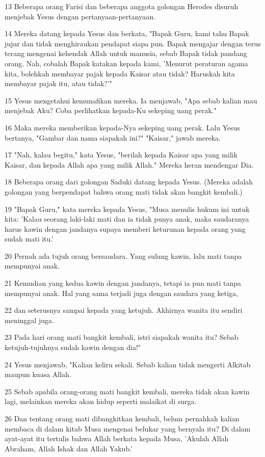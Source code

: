 \par 13 Beberapa orang Farisi dan beberapa anggota golongan Herodes disuruh menjebak Yesus dengan pertanyaan-pertanyaan.
\par 14 Mereka datang kepada Yesus dan berkata, "Bapak Guru, kami tahu Bapak jujur dan tidak menghiraukan pendapat siapa pun. Bapak mengajar dengan terus terang mengenai kehendak Allah untuk manusia, sebab Bapak tidak pandang orang. Nah, cobalah Bapak katakan kepada kami, 'Menurut peraturan agama kita, bolehkah membayar pajak kepada Kaisar atau tidak? Haruskah kita membayar pajak itu, atau tidak?'"
\par 15 Yesus mengetahui kemunafikan mereka. Ia menjawab, "Apa sebab kalian mau menjebak Aku? Coba perlihatkan kepada-Ku sekeping uang perak."
\par 16 Maka mereka memberikan kepada-Nya sekeping uang perak. Lalu Yesus bertanya, "Gambar dan nama siapakah ini?" "Kaisar," jawab mereka.
\par 17 "Nah, kalau begitu," kata Yesus, "berilah kepada Kaisar apa yang milik Kaisar, dan kepada Allah apa yang milik Allah." Mereka heran mendengar Dia.
\par 18 Beberapa orang dari golongan Saduki datang kepada Yesus. (Mereka adalah golongan yang berpendapat bahwa orang mati tidak akan bangkit kembali.)
\par 19 "Bapak Guru," kata mereka kepada Yesus, "Musa menulis hukum ini untuk kita: 'Kalau seorang laki-laki mati dan ia tidak punya anak, maka saudaranya harus kawin dengan jandanya supaya memberi keturunan kepada orang yang sudah mati itu.'
\par 20 Pernah ada tujuh orang bersaudara. Yang sulung kawin, lalu mati tanpa mempunyai anak.
\par 21 Kemudian yang kedua kawin dengan jandanya, tetapi ia pun mati tanpa mempunyai anak. Hal yang sama terjadi juga dengan saudara yang ketiga,
\par 22 dan seterusnya sampai kepada yang ketujuh. Akhirnya wanita itu sendiri meninggal juga.
\par 23 Pada hari orang mati bangkit kembali, istri siapakah wanita itu? Sebab ketujuh-tujuhnya sudah kawin dengan dia!"
\par 24 Yesus menjawab, "Kalian keliru sekali. Sebab kalian tidak mengerti Alkitab maupun kuasa Allah.
\par 25 Sebab apabila orang-orang mati bangkit kembali, mereka tidak akan kawin lagi, melainkan mereka akan hidup seperti malaikat di surga.
\par 26 Dan tentang orang mati dibangkitkan kembali, belum pernahkah kalian membaca di dalam kitab Musa mengenai belukar yang bernyala itu? Di dalam ayat-ayat itu tertulis bahwa Allah berkata kepada Musa, 'Akulah Allah Abraham, Allah Ishak dan Allah Yakub.'
